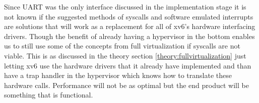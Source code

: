 Since UART was the only interface discussed in the implementation stage it is not known if the suggested methods of syscalls and software emulated interrupts are solutions that will work as a replacement for all of xv6’s hardware interfacing drivers. Though the benefit of already having a hypervisor in the bottom enables us to still use some of the concepts from full virtualization if syscalls are not viable. This is as discussed in the theory section \ref{theory:fullvirtualization} just letting xv6 use the hardware drivers that it already have implemented and than have a trap handler in the hypervisor which knows how to translate these hardware calls. Performance will not be as optimal but the end product will be something that is functional.